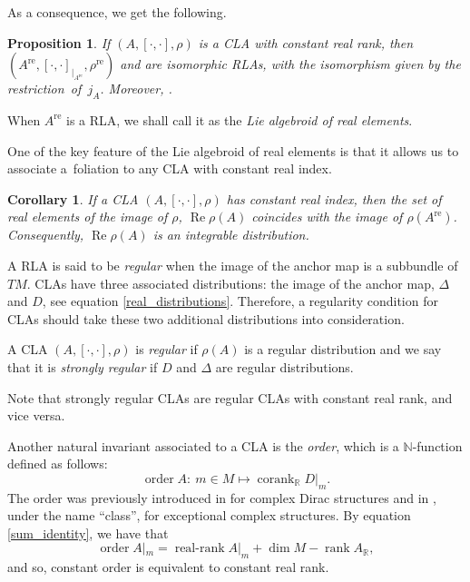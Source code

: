 \documentclass[11pt]{article}
\numberwithin{equation}{section}
\numberwithin{equation}{section}
\newtheorem{Corollary}[Theorem]{Corollary}
\newtheorem{Proposition}[Theorem]{Proposition}
 { \theoremstyle{definition}
\newtheorem{Definition}[Theorem]{Definition}
\newtheorem{Note}[Theorem]{Note}
\newtheorem{Example}[Theorem]{Example}
\newtheorem{Examples}[Theorem]{Examples}
\newtheorem{Remark}[Theorem]{Remark} }
\newcommand{\R}{{\mathbb{R}}}
\DeclareMathOperator{\order}{order}
\DeclareMathOperator{\re}{Re}
\DeclareMathOperator{\rk}{rank}
\DeclareMathOperator{\cork}{corank}
\DeclareMathOperator{\real}{re}
\DeclareMathOperator{\rerk}{real-rank}
\begin{document}
As a consequence, we get the following.
 \begin{Proposition}
 If $(A, [\cdot, \cdot], \rho)$ is a CLA with constant real rank, then $(A^{\real}, [\cdot, \cdot]_{|_{A^{\real}}}, \rho^{\real})$ and
 \smash{$(j_A(A^{\real}), j_A[\cdot, \cdot]_{|_{j_A(A^{\real})}}, \rho^{{\rm im}})$} are isomorphic RLAs, with the isomorphism given by the restric\-tion~of~$j_A$. Moreover, \smash{$\rho^{\real}(A^{\real})=\rho^{{\rm im}}(j_A(A^{\real}))=\Delta$}.
 \end{Proposition}

 {\samepage \begin{Definition}
 When $A^{\real}$ is a RLA, we shall call it as the {\em Lie algebroid of real elements}.
 \end{Definition}

 One of the key feature of the Lie algebroid of real elements is that it allows us to associate a~foliation to any CLA with constant real index.
 \begin{Corollary}
 If a CLA $(A, [\cdot, \cdot], \rho)$ has constant real index, then the set of real elements of the image of $\rho$, $\re\rho(A)$ coincides with the image of $\rho(A^{\real})$. Consequently, $\re\rho(A)$ is an integrable distribution.
 \end{Corollary}

 }

 A RLA is said to be {\em regular} when the image of the anchor map is a subbundle of $TM$. CLAs have three associated distributions: the image of the anchor map, $\Delta$ and $D$, see equation \eqref{real_distributions}. Therefore, a regularity condition for CLAs should take these two additional distributions into consideration.
 \begin{Definition}
 A CLA $(A,[\cdot,\cdot], \rho)$ is {\em regular} if $\rho(A)$ is a regular distribution and we say that it is {\em strongly regular} if $D$ and $\Delta$ are regular distributions.
\end{Definition}
 Note that strongly regular CLAs are regular CLAs with constant real rank, and vice versa.
\begin{Remark}
 Another natural invariant associated to a CLA is the {\em order}, which is a $\mathbb{N}$-function defined as follows:
 \[\order A\colon \ m\in M\mapsto \cork_{\R} D|_{m}.\]
The order was previously introduced in \cite{aguero2022complex} for complex Dirac structures and in \cite{tennyson2021exceptional}, under the name ``class'', for exceptional complex structures.
By equation \eqref{sum_identity}, we have that
\begin{equation}\label{orderrr}
\order A|_m=\rerk A|_m+\dim M-\rk A_{\R},
\end{equation}
and so, constant order is equivalent to constant real rank.
\end{Remark}
\end{document}
